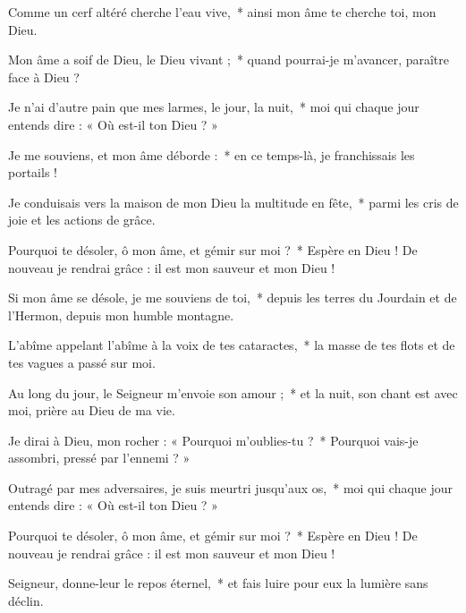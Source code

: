 \item Comme un cerf altéré cherche l'eau vive,~* ainsi mon âme te cherche toi, mon Dieu.

\item Mon âme a soif de Dieu, le Dieu vivant ;~* quand pourrai-je m'avancer, paraître face à Dieu ?

\item Je n'ai d'autre pain que mes larmes, le jour, la nuit,~* moi qui chaque jour entends dire : « Où est-il ton Dieu ? »

\item Je me souviens, et mon âme déborde :~* en ce temps-là, je franchissais les portails ! 

\item Je conduisais vers la maison de mon Dieu la multitude en fête,~* parmi les cris de joie et les actions de grâce.

\item Pourquoi te désoler, ô mon âme, et gémir sur moi ?~* Espère en Dieu ! De nouveau je rendrai grâce : il est mon sauveur et mon Dieu !

\item Si mon âme se désole, je me souviens de toi,~* depuis les terres du Jourdain et de l'Hermon, depuis mon humble montagne.

\item L'abîme appelant l'abîme à la voix de tes cataractes,~* la masse de tes flots et de tes vagues a passé sur moi.

\item Au long du jour, le Seigneur m'envoie son amour ;~* et la nuit, son chant est avec moi, prière au Dieu de ma vie.

\item Je dirai à Dieu, mon rocher : « Pourquoi m'oublies-tu ?~* Pourquoi vais-je assombri, pressé par l'ennemi ? »

\item Outragé par mes adversaires, je suis meurtri jusqu'aux os,~* moi qui chaque jour entends dire : « Où est-il ton Dieu ? »

\item Pourquoi te désoler, ô mon âme, et gémir sur moi ?~* Espère en Dieu ! De nouveau je rendrai grâce : il est mon sauveur et mon Dieu !

\item Seigneur, donne-leur le repos éternel,~* et fais luire pour eux la lumière sans déclin.